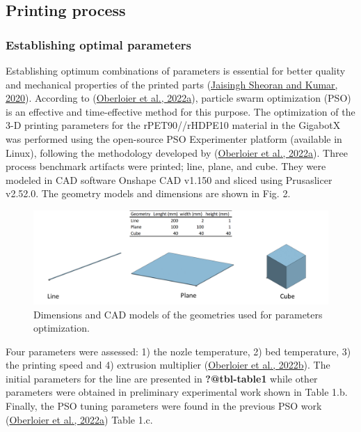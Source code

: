 \documentclass[
  12pt,
  number,
  review]{elsarticle}
\begin{document}
\hypertarget{printing-process}{%
\subsection{Printing process}\label{printing-process}}

\hypertarget{establishing-optimal-parameters}{%
\subsubsection{Establishing optimal
parameters}\label{establishing-optimal-parameters}}

Establishing optimum combinations of parameters is essential for better
quality and mechanical properties of the printed parts
(\protect\hyperlink{ref-jaisinghsheoran2020}{Jaisingh Sheoran and Kumar,
2020}). According to (\protect\hyperlink{ref-oberloier2022}{Oberloier et
al., 2022a}), particle swarm optimization (PSO) is an effective and
time-effective method for this purpose. The optimization of the 3-D
printing parameters for the rPET90//rHDPE10 material in the GigabotX was
performed using the open-source PSO Experimenter platform (available in
Linux), following the methodology developed by
(\protect\hyperlink{ref-oberloier2022}{Oberloier et al., 2022a}). Three
process benchmark artifacts were printed; line, plane, and cube. They
were modeled in CAD software Onshape CAD v1.150 and sliced using
Prusaslicer v2.52.0. The geometry models and dimensions are shown in
Fig. 2.

\begin{figure}

{\centering \includegraphics{figures/Figure-2.png}

}

\caption{Dimensions and CAD models of the geometries used for parameters
optimization.}

\end{figure}

Four parameters were assessed: 1) the nozle temperature, 2) bed
temperature, 3) the printing speed and 4) extrusion multiplier
(\protect\hyperlink{ref-oberloier2022a}{Oberloier et al., 2022b}). The
initial parameters for the line are presented in \textbf{?@tbl-table1}
while other parameters were obtained in preliminary experimental work
shown in Table 1.b. Finally, the PSO tuning parameters were found in the
previous PSO work (\protect\hyperlink{ref-oberloier2022}{Oberloier et
al., 2022a}) Table 1.c.
\end{document}
